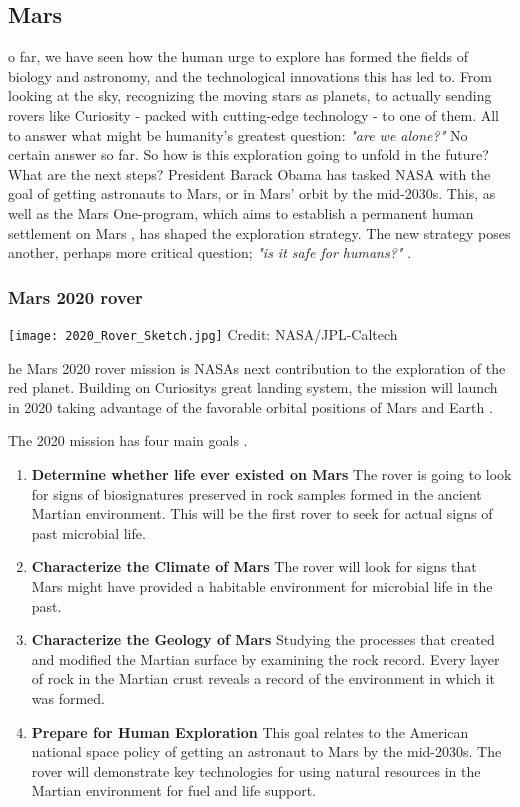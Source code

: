 \subsection{Mars}
o far, we have seen how the human urge to explore has formed the fields of biology and astronomy, and the technological innovations this has led to.
From looking at the sky, recognizing the moving stars as planets, to actually sending rovers like Curiosity - packed with cutting-edge technology - to one of them.
All to answer what might be humanity's greatest question: \emph{"are we alone?"}
No certain answer so far.
So how is this exploration going to unfold in the future?
What are the next steps?
President Barack Obama has tasked NASA with the goal of getting astronauts to Mars, or in Mars' orbit by the mid-2030s.
This, as well as the Mars One-program, which aims to establish a permanent human settlement on Mars \cite{FPlan12}, has shaped the exploration strategy.
The new strategy poses another, perhaps more critical question; \emph{"is it safe for humans?"} \cite{FPlan01}.

\subsubsection{Mars 2020 rover}

\begin{center}
	\texttt{[image: 2020\_Rover\_Sketch.jpg]}
	\tiny{Credit: NASA/JPL-Caltech}
\end{center}

he Mars 2020 rover mission is NASAs next contribution to the exploration of the red planet. 
Building on Curiositys great landing system, the mission will launch in 2020 taking advantage of the favorable orbital positions of Mars and Earth \cite{FPlan14}.

The 2020 mission has four main goals \cite{FPlan13}.

\begin{enumerate}
	\item \textbf{Determine whether life ever existed on Mars}
The rover is going to look for signs of biosignatures preserved in rock samples formed in the ancient Martian environment.
This will be the first rover to seek for actual signs of past microbial life.
	\item \textbf{Characterize the Climate of Mars}
The rover will look for signs that Mars might have provided a habitable environment for microbial life in the past. 
	\item \textbf{Characterize the Geology of Mars}
Studying the processes that created and modified the Martian surface by examining the rock record.
Every layer of rock in the Martian crust reveals a record of the environment in which it was formed.
	\item \textbf{Prepare for Human Exploration}
This goal relates to the American national space policy of getting an astronaut to Mars by the mid-2030s.
The rover will demonstrate key technologies for using natural resources in the Martian environment for fuel and life support. 
\end{enumerate}

